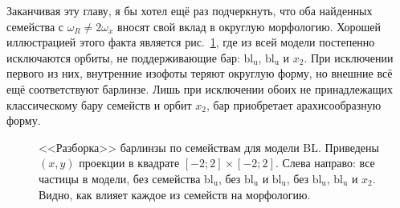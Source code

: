 \documentclass[tikz]{trlnotes}
\begin{document}
Заканчивая эту главу, я бы хотел ещё раз подчеркнуть, что оба найденных семейства с $ω_R \neq 2ω_x$ вносят свой вклад в
округлую морфологию. Хорошей иллюстрацией этого факта является рис.~\ref{fig:lensapart}, где из всей модели постепенно
исключаются орбиты, не поддерживающие бар: $\text{bl}_\text{u}$, $\text{bl}_\text{u}$ и $x_2$. При исключении
первого из них, внутренние изофоты теряют округлую форму, но внешние всё ещё соответствуют барлинзе.
Лишь при исключении обоих не принадлежащих классическому бару семейств и орбит $x_2$, бар приобретает арахисообразную форму.
\begin{figure}[htpb]
  \centering
  \caption{<<Разборка>> барлинзы по семействам для модели BL. Приведены $(x,y)$ проекции в квадрате $[-2;2]\times [-2;2]$.
  Слева направо: все частицы в модели, без семейства $\text{bl}_\text{u}$, без $\text{bl}_\text{u}$ и $\text{bl}_\text{u}$, 
без $\text{bl}_\text{u}$, $\text{bl}_\text{u}$ и $x_2$. Видно, как влияет каждое из семейств на морфологию.}%
  \label{fig:lensapart}
\end{figure}
\end{document}
